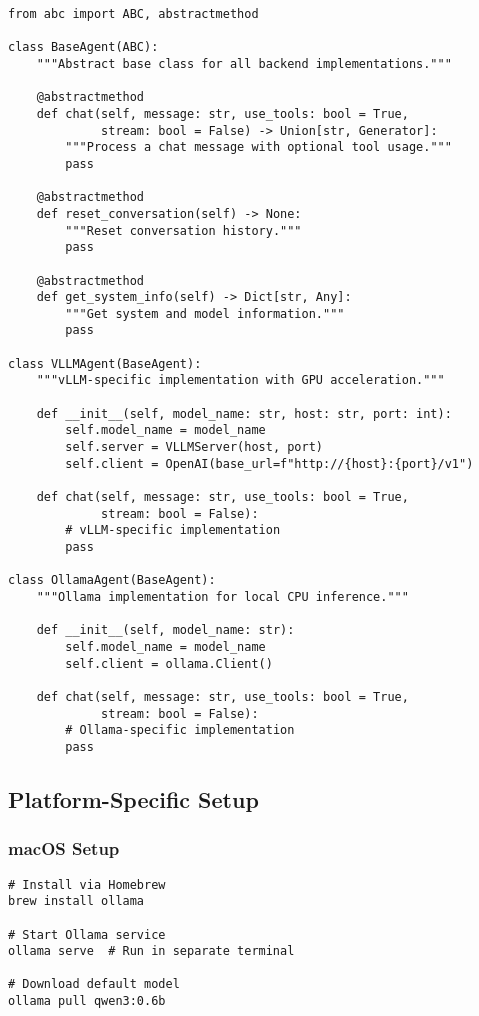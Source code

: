 \documentclass{article}
\begin{document}
\begin{lstlisting}[caption=Backend Abstraction Interface]
from abc import ABC, abstractmethod

class BaseAgent(ABC):
    """Abstract base class for all backend implementations."""

    @abstractmethod
    def chat(self, message: str, use_tools: bool = True,
             stream: bool = False) -> Union[str, Generator]:
        """Process a chat message with optional tool usage."""
        pass

    @abstractmethod
    def reset_conversation(self) -> None:
        """Reset conversation history."""
        pass

    @abstractmethod
    def get_system_info(self) -> Dict[str, Any]:
        """Get system and model information."""
        pass

class VLLMAgent(BaseAgent):
    """vLLM-specific implementation with GPU acceleration."""

    def __init__(self, model_name: str, host: str, port: int):
        self.model_name = model_name
        self.server = VLLMServer(host, port)
        self.client = OpenAI(base_url=f"http://{host}:{port}/v1")

    def chat(self, message: str, use_tools: bool = True,
             stream: bool = False):
        # vLLM-specific implementation
        pass

class OllamaAgent(BaseAgent):
    """Ollama implementation for local CPU inference."""

    def __init__(self, model_name: str):
        self.model_name = model_name
        self.client = ollama.Client()

    def chat(self, message: str, use_tools: bool = True,
             stream: bool = False):
        # Ollama-specific implementation
        pass
\end{lstlisting}

\subsection{Platform-Specific Setup}

\subsubsection{macOS Setup}

\begin{lstlisting}[caption=macOS Installation]
# Install via Homebrew
brew install ollama

# Start Ollama service
ollama serve  # Run in separate terminal

# Download default model
ollama pull qwen3:0.6b
\end{lstlisting}
\end{document}

